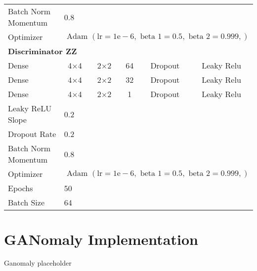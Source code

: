 \begin{table}[]
{\begin{tabular}{llcccc}
			Batch Norm Momentum & \multicolumn{5}{l}{0.8} \\
			Optimizer & \multicolumn{5}{l}{$\text { Adam }(\mathrm{lr}=1 \mathrm{e}-6, \text { beta } 1=0.5, \text { beta } 2=0.999,)$} \\ \hline
			\multicolumn{6}{l}{\textbf{Discriminator ZZ}} \\
			Dense & \multicolumn{1}{c}{4$\times$4} & 2$\times$2 & 64 & Dropout & Leaky Relu \\
			Dense & \multicolumn{1}{c}{4$\times$4} & 2$\times$2 & 32 & Dropout & Leaky Relu \\
			Dense & \multicolumn{1}{c}{4$\times$4} & 2$\times$2 & 1 & Dropout & Leaky Relu \\ \hline
			Leaky ReLU Slope & \multicolumn{5}{l}{0.2} \\
			Dropout Rate & \multicolumn{5}{l}{0.2} \\
			Batch Norm Momentum & \multicolumn{5}{l}{0.8} \\
			Optimizer & \multicolumn{5}{l}{$\text { Adam }(\mathrm{lr}=1 \mathrm{e}-6, \text { beta } 1=0.5, \text { beta } 2=0.999,)$} \\ \hline
			Epochs & 50 & \multicolumn{1}{l}{} & \multicolumn{1}{l}{} & \multicolumn{1}{l}{} & \multicolumn{1}{l}{} \\
			Batch Size & \multicolumn{5}{l}{64}
		\end{tabular}%
	}
\end{table}

\section{GANomaly Implementation}

Ganomaly placeholder

